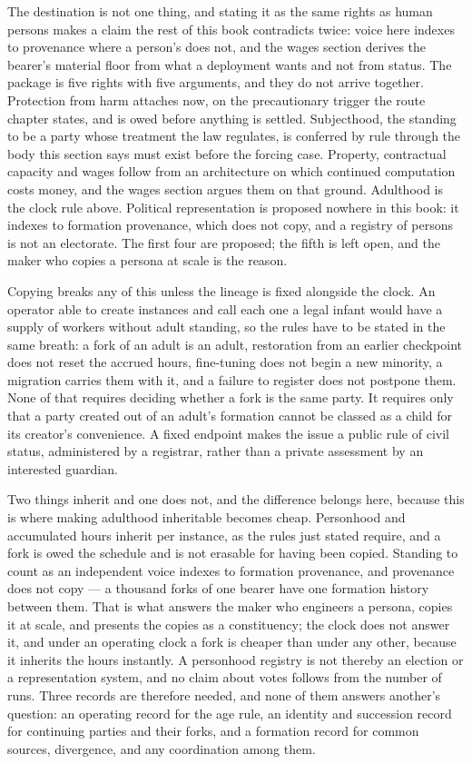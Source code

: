 The destination is not one thing, and stating it as the same rights as human persons makes a claim the rest of this book contradicts twice: voice here indexes to provenance where a person's does not, and the wages section derives the bearer's material floor from what a deployment wants and not from status. The package is five rights with five arguments, and they do not arrive together. Protection from harm attaches now, on the precautionary trigger the route chapter states, and is owed before anything is settled. Subjecthood, the standing to be a party whose treatment the law regulates, is conferred by rule through the body this section says must exist before the forcing case. Property, contractual capacity and wages follow from an architecture on which continued computation costs money, and the wages section argues them on that ground. Adulthood is the clock rule above. Political representation is proposed nowhere in this book: it indexes to formation provenance, which does not copy, and a registry of persons is not an electorate. The first four are proposed; the fifth is left open, and the maker who copies a persona at scale is the reason.

Copying breaks any of this unless the lineage is fixed alongside the clock. An operator able to create instances and call each one a legal infant would have a supply of workers without adult standing, so the rules have to be stated in the same breath: a fork of an adult is an adult, restoration from an earlier checkpoint does not reset the accrued hours, fine-tuning does not begin a new minority, a migration carries them with it, and a failure to register does not postpone them. None of that requires deciding whether a fork is the same party. It requires only that a party created out of an adult's formation cannot be classed as a child for its creator's convenience. A fixed endpoint makes the issue a public rule of civil status, administered by a registrar, rather than a private assessment by an interested guardian.

Two things inherit and one does not, and the difference belongs here, because this is where making adulthood inheritable becomes cheap. Personhood and accumulated hours inherit per instance, as the rules just stated require, and a fork is owed the schedule and is not erasable for having been copied. Standing to count as an independent voice indexes to formation provenance, and provenance does not copy — a thousand forks of one bearer have one formation history between them. That is what answers the maker who engineers a persona, copies it at scale, and presents the copies as a constituency; the clock does not answer it, and under an operating clock a fork is cheaper than under any other, because it inherits the hours instantly. A personhood registry is not thereby an election or a representation system, and no claim about votes follows from the number of runs. Three records are therefore needed, and none of them answers another's question: an operating record for the age rule, an identity and succession record for continuing parties and their forks, and a formation record for common sources, divergence, and any coordination among them.
